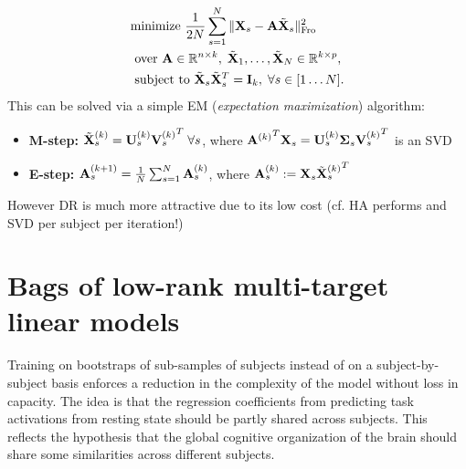 \begin{eqnarray}
  \begin{split}
    &\text{minimize }\frac{1}{2N}\sum_{s=1}^N\|\mathbf{X}_s - \mathbf{A}\tilde{\mathbf{X}}_s\|^2_{\text{Fro}}\\
    &\text{ over }
  \mathbf{A} \in \mathbb R^{n \times k},\;\tilde{\mathbf{X}}_1,\ldots,\tilde{\mathbf{X}}_N \in \mathbb R^{k \times p},
  \\
  &\text{ subject to }\tilde{\mathbf{X}}_s\tilde{\mathbf{X}}_s^T = \mathbf{I}_k,\; \forall s \in [1\ldots N].
  \end{split}
\end{eqnarray}
This can be solved via a simple EM (\textit{expectation maximization}) algorithm:

\begin{itemize}
\item \textbf{M-step:} $\tilde{\mathbf{X}}_s^{(k)} = \mathbf{U}_s^{(k)}{\mathbf{V}_s^{(k)}}^T\; \forall s$, where ${\mathbf{A}^{(k)}}^T\mathbf{X}_s = \mathbf{U}_s^{(k)}\boldsymbol{\Sigma}_s{\mathbf{V}_s^{(k)}}^T$ is an SVD
\item \textbf{E-step:} $\mathbf{A}_s^{(k+1)} = \frac{1}{N}\sum_{s=1}^N\mathbf{A}_s^{(k)}$, where $\mathbf{A}_s^{(k)} := \mathbf{X}_s{{}\tilde{\mathbf{X}}_s^{(k)}}^T$
\end{itemize}

However DR is much more attractive due to its low cost (cf. HA performs and SVD per subject per iteration!)

\section{Bags of low-rank multi-target linear models}
\label{sec:bags}
Training on bootstraps of sub-samples of subjects instead of on a subject-by-subject
basis enforces a reduction in the complexity of the model without loss in capacity.
The idea is that the regression coefficients from predicting task activations
from resting state should be partly shared across subjects. 
%
This reflects the hypothesis that the global cognitive organization of the brain should share some
similarities across different subjects.

